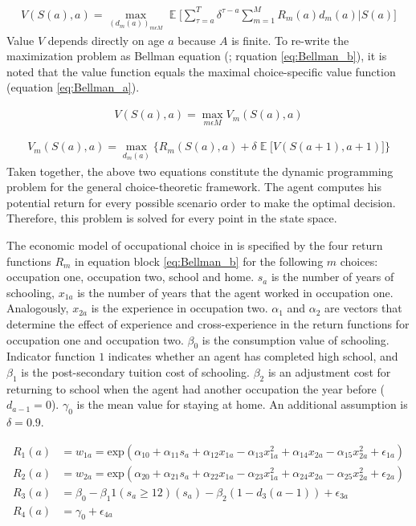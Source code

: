 \documentclass[a4paper,12pt]{article}
\DeclareMathOperator*{\E}{\mathbb{E}}
\begin{document}
\begin{align}
V(S(a),a) = \max_{(d_m(a))_{m \epsilon M}} \E\bigg[\sum_{\tau=a}^T \delta^{\tau-a} \sum_{m=1}^M R_m(a)d_m(a) | S(a)\bigg]
\end{align}
Value $V$ depends directly on age $a$ because $A$ is finite. To re-write the maximization problem as Bellman equation (\cite{Bellman.1957}; rquation \ref{eq:Bellman_b}), it is noted that the value function equals the maximal choice-specific value function (equation \ref{eq:Bellman_a}).

\begin{align} \label{eq:Bellman_a}
V(S(a),a) = \max_{m \epsilon M} V_m(S(a),a)
\end{align}

\begin{align} \label{eq:Bellman_b}
V_m(S(a),a) = \max_{d_m(a)} \bigg\{R_m(S(a),a) + \delta \E\big[V(S(a+1),a+1)\big] \bigg\}
\end{align}
Taken together, the above two equations constitute the dynamic programming problem for the general choice-theoretic framework. The agent computes his potential return for every possible scenario order to make the optimal decision. Therefore, this problem is solved for every point in the state space.

The economic model of occupational choice in \cite{Keane.1994} is specified by the four return functions $R_m$ in equation block \ref{eq:Bellman_b} for the following $m$ choices: occupation one, occupation two, school and home. $s_a$ is the number of years of schooling, $x_{1a}$ is the number of years that the agent worked in occupation one. Analogously, $x_{2a}$ is the experience in occupation two. $\alpha_1$ and $\alpha_2$ are vectors that determine the effect of experience and cross-experience in the return functions for occupation one and occupation two. $\beta_0$ is the consumption value of schooling. Indicator function $1$ indicates whether an agent has completed high school, and $\beta_1$ is the post-secondary tuition cost of schooling. $\beta_2$ is an adjustment cost for returning to school when the agent had another occupation the year before ($d_{a-1}=0$). $\gamma_0$ is the mean value for staying at home. An additional assumption is $\delta = 0.9$.

\begin{equation} \label{eq:returns}
\begin{aligned}
R_1(a) &= w_{1a} = \text{exp}(\alpha_{10} + \alpha_{11} s_a + \alpha_{12} x_{1a} - \alpha_{13} x^2_{1a} + \alpha_{14} x_{2a}- \alpha_{15} x^2_{2a} + \epsilon_{1a}) \\
R_2(a) &= w_{2a} = \text{exp}(\alpha_{20} + \alpha_{21} s_a + \alpha_{22} x_{1a} - \alpha_{23} x^2_{1a} + \alpha_{24} x_{2a}- \alpha_{25} x^2_{2a} + \epsilon_{2a}) \\
R_3(a) &= \beta_0 - \beta_1 1(s_a \geq 12) (s_a) - \beta_2(1-d_3(a-1)) + \epsilon_{3a} \\
R_4(a) &= \gamma_0 + \epsilon_{4a} \\
\end{aligned}
\end{equation}
\end{document}
